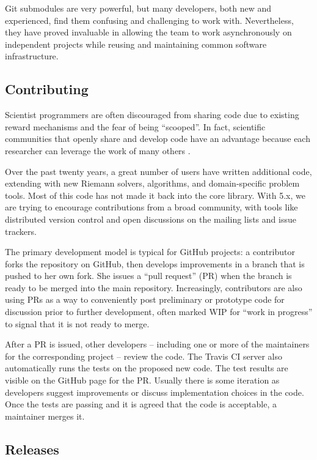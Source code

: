 Git submodules are very powerful, but many developers, both new and
experienced, find them confusing and challenging to work with.
Nevertheless, they have proved invaluable in allowing the \clawpack team to
work asynchronously on independent projects while reusing and maintaining
common software infrastructure.

\subsection{Contributing}

Scientist programmers are often discouraged from sharing code
due to existing reward mechanisms and the fear of being ``scooped''.
In fact, scientific communities that openly share and develop code
have an advantage because each researcher can leverage the work of
many others \cite{Turk:2013hd}.

Over the past twenty years, a great number of users have written
additional code, extending \clawpack with new Riemann solvers,
algorithms, and domain-specific problem tools.  Most of this code
has not made it back into the core library.  With \clawpack 5.x,
we are trying to encourage contributions from a broad community, with
tools like distributed version control and open discussions on 
the mailing lists and issue trackers.

The primary development model is typical for GitHub projects: a
contributor forks the repository on GitHub, then develops improvements
in a branch that is pushed to her own fork.  She issues a ``pull
request'' (PR) when the branch is ready to be merged into the main
repository.  Increasingly, contributors are also using PRs as a way to
conveniently post preliminary or prototype code for discussion prior
to further development, often marked WIP for ``work in progress'' to signal
that it is not ready to merge.

After a PR is issued, other developers -- including one or more of the
maintainers for the corresponding project -- review the code.  The Travis
CI server also automatically runs the tests on the proposed new code.  The test
results are visible on the GitHub page for the PR.  Usually there is
some iteration as developers suggest improvements or discuss
implementation choices in the code.  Once the tests are passing and it
is agreed that the code is acceptable, a maintainer merges it.

\subsection{Releases}

